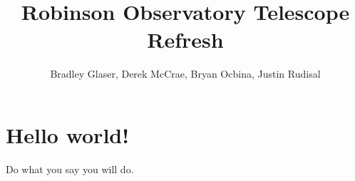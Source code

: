 \documentclass[]{report}
\title{Robinson Observatory Telescope Refresh}
\author{Bradley Glaser, Derek McCrae, Bryan Ocbina, Justin Rudisal}
\begin{document}
\maketitle

\begin{abstract}
\end{abstract}

\section*{Hello world!}
Do what you say you will do.\cite{heinrich}

\printbibliography
\end{document}
